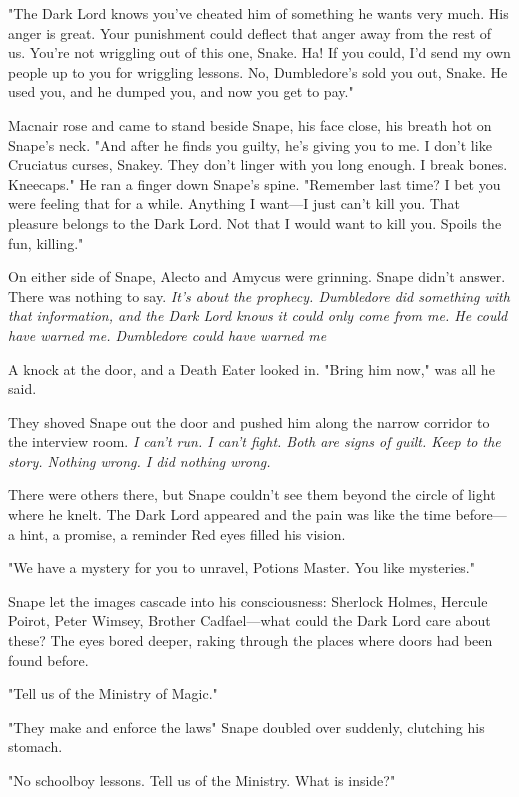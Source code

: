 "The Dark Lord knows you've cheated him of something he wants very much. His anger is great. Your punishment could deflect that anger away from the rest of us. You're not wriggling out of this one, Snake. Ha! If you could, I'd send my own people up to you for wriggling lessons. No, Dumbledore's sold you out, Snake. He used you, and he dumped you, and now you get to pay."

Macnair rose and came to stand beside Snape, his face close, his breath hot on Snape's neck. "And after he finds you guilty, he's giving you to me. I don't like Cruciatus curses, Snakey. They don't linger with you long enough. I break bones. Kneecaps." He ran a finger down Snape's spine. "Remember last time? I bet you were feeling that for a while. Anything I want—I just can't kill you. That pleasure belongs to the Dark Lord. Not that I would want to kill you. Spoils the fun, killing."

On either side of Snape, Alecto and Amycus were grinning. Snape didn't answer. There was nothing to say. \emph{It's about the prophecy. Dumbledore did something with that information, and the Dark Lord knows it could only come from me. He could have warned me. Dumbledore could have warned me{\el}}

A knock at the door, and a Death Eater looked in. "Bring him now," was all he said.

They shoved Snape out the door and pushed him along the narrow corridor to the interview room. \emph{I can't run. I can't fight. Both are signs of guilt. Keep to the story. Nothing wrong. I did nothing wrong.}

There were others there, but Snape couldn't see them beyond the circle of light where he knelt. The Dark Lord appeared and the pain was like the time before—a hint, a promise, a reminder{\el} Red eyes filled his vision.

"We have a mystery for you to unravel, Potions Master. You like mysteries."

Snape let the images cascade into his consciousness: Sherlock Holmes, Hercule Poirot, Peter Wimsey, Brother Cadfael—what could the Dark Lord care about these? The eyes bored deeper, raking through the places where doors had been found before.

"Tell us of the Ministry of Magic."

"They make and enforce the laws{\el}" Snape doubled over suddenly, clutching his stomach.

"No schoolboy lessons. Tell us of the Ministry. What is inside?"


